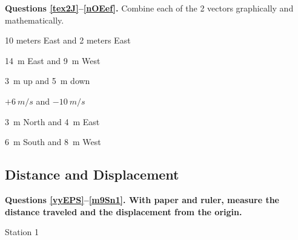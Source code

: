 \documentclass[answers]{exam}
\begin{document}
\begin{questions}

\begin{EnvUplevel}
    \textbf{Questions \ref{tex2J}--\ref{nOEef}.} Combine each of the 2 vectors graphically and mathematically.
\end{EnvUplevel} 

\question \label{tex2J}
10 meters East and 2 meters East

\question
\SI{14}{m} East and \SI{9}{m} West

\question
\SI{3}{m} up and \SI{5}{m} down

\question 
$+\SI{6}{m/s}$ and $-\SI{10}{m/s}$

\question
\SI{3}{m} North and \SI{4}{m} East

\question \label{nOEef}
\SI{6}{m} South and \SI{8}{m} West


\clearpage
\begin{EnvUplevel}
    \subsection{Distance and Displacement}   

    \textbf{Questions \ref{vyEPS}--\ref{m9Sn1}. With paper and ruler, measure the distance traveled and the displacement from the origin.}      
\end{EnvUplevel}

\clearpage

\question \label{vyEPS}
Station 1

\begin{center}
\end{center}

\begin{solution}
\begin{center}
\end{center}


\end{solution}
\end{questions}
\end{document}
